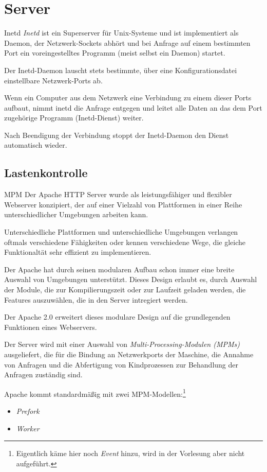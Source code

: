 \section{Server}

\begin{bonus}{Inetd}
    \emph{Inetd} ist ein Superserver für Unix-Systeme und ist implementiert als Daemon, der Netzwerk-Sockets abhört und bei Anfrage auf einem bestimmten Port ein voreingestelltes Programm (meist selbst ein Daemon) startet.

    Der Inetd-Daemon lauscht stets bestimmte, über eine Konfigurationsdatei einstellbare Netzwerk-Ports ab.

    Wenn ein Computer aus dem Netzwerk eine Verbindung zu einem dieser Ports aufbaut, nimmt inetd die Anfrage entgegen und leitet alle Daten an das dem Port zugehörige Programm (Inetd-Dienst) weiter.

    Nach Beendigung der Verbindung stoppt der Inetd-Daemon den Dienst automatisch wieder.
\end{bonus}

\subsection{Lastenkontrolle}

\begin{defi}{MPM}
    Der Apache HTTP Server wurde als leistungsfähiger und flexibler Webserver konzipiert, der auf einer Vielzahl von Plattformen in einer Reihe unterschiedlicher Umgebungen arbeiten kann.

    Unterschiedliche Plattformen und unterschiedliche Umgebungen verlangen oftmals verschiedene Fähigkeiten oder kennen verschiedene Wege, die gleiche Funktionaltät sehr effizient zu implementieren.

    Der Apache hat durch seinen modularen Aufbau schon immer eine breite Auswahl von Umgebungen unterstützt.
    Dieses Design erlaubt es, durch Auswahl der Module, die zur Kompilierungszeit oder zur Laufzeit geladen werden, die Features auszuwählen, die in den Server intregiert werden.

    Der Apache 2.0 erweitert dieses modulare Design auf die grundlegenden Funktionen eines Webservers.

    Der Server wird mit einer Auswahl von \emph{Multi-Processing-Modulen (MPMs)} ausgeliefert, die für die Bindung an Netzwerkports der Maschine, die Annahme von Anfragen und die Abfertigung von Kindprozessen zur Behandlung der Anfragen zuständig sind.

    Apache kommt standardmäßig mit zwei MPM-Modellen:\footnote{Eigentlich käme hier noch \emph{Event} hinzu, wird in der Vorlesung aber nicht aufgeführt.}
    \begin{itemize}
        \item \emph{Prefork}
        \item \emph{Worker}
    \end{itemize}
\end{defi}

